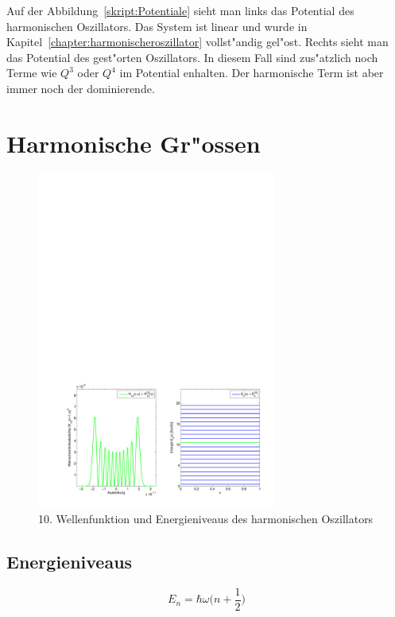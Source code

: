 \begin{refsection}
Auf der Abbildung~\ref{skript:Potentiale} sieht man links das Potential des harmonischen Oszillators. Das System ist linear und wurde in Kapitel~\ref{chapter:harmonischeroszillator} vollst"andig gel"ost. Rechts sieht man das Potential des gest"orten Oszillators. In diesem Fall sind zus"atzlich noch Terme wie $Q^3$ oder $Q^4$ im Potential enhalten. Der harmonische Term ist aber immer noch der dominierende.

\section{Harmonische Gr"ossen}

\begin{figure}	%
\centering
\includegraphics[width=0.7\textwidth]{anharmonisch/images/Harmonisch.pdf}
\caption{10. Wellenfunktion und Energieniveaus des harmonischen Oszillators
\label{skript:Harmonisch}}
\end{figure}

\subsection{Energieniveaus}
\[
E_n
=
\hbar\omega\biggl(n+\frac12\biggr)
\]


\end{refsection}
